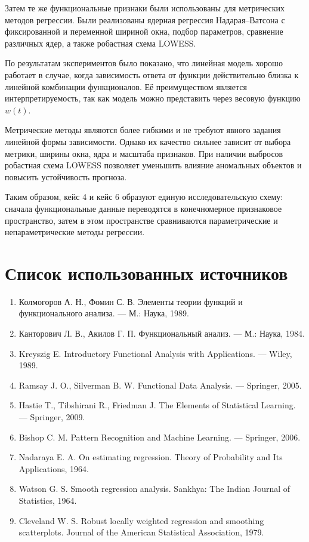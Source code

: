 \documentclass[14pt,a4paper]{extarticle}
\begin{document}
Затем те же функциональные признаки были использованы для метрических методов регрессии. Были реализованы ядерная регрессия Надарая--Ватсона с фиксированной и переменной шириной окна, подбор параметров, сравнение различных ядер, а также робастная схема LOWESS.

По результатам экспериментов было показано, что линейная модель хорошо работает в случае, когда зависимость ответа от функции действительно близка к линейной комбинации функционалов. Её преимуществом является интерпретируемость, так как модель можно представить через весовую функцию \(w(t)\).

Метрические методы являются более гибкими и не требуют явного задания линейной формы зависимости. Однако их качество сильнее зависит от выбора метрики, ширины окна, ядра и масштаба признаков. При наличии выбросов робастная схема LOWESS позволяет уменьшить влияние аномальных объектов и повысить устойчивость прогноза.

Таким образом, кейс 4 и кейс 6 образуют единую исследовательскую схему: сначала функциональные данные переводятся в конечномерное признаковое пространство, затем в этом пространстве сравниваются параметрические и непараметрические методы регрессии.

\newpage


\section*{Список использованных источников}

\begin{enumerate}
    \item Колмогоров А. Н., Фомин С. В. Элементы теории функций и функционального анализа. — М.: Наука, 1989.
    \item Канторович Л. В., Акилов Г. П. Функциональный анализ. — М.: Наука, 1984.
    \item Kreyszig E. Introductory Functional Analysis with Applications. — Wiley, 1989.
    \item Ramsay J. O., Silverman B. W. Functional Data Analysis. — Springer, 2005.
    \item Hastie T., Tibshirani R., Friedman J. The Elements of Statistical Learning. — Springer, 2009.
    \item Bishop C. M. Pattern Recognition and Machine Learning. — Springer, 2006.
    \item Nadaraya E. A. On estimating regression. Theory of Probability and Its Applications, 1964.
    \item Watson G. S. Smooth regression analysis. Sankhya: The Indian Journal of Statistics, 1964.
    \item Cleveland W. S. Robust locally weighted regression and smoothing scatterplots. Journal of the American Statistical Association, 1979.
\end{enumerate}
\end{document}
